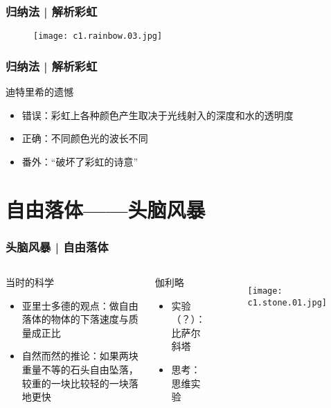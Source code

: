 \begin{frame}
  \frametitle{归纳法 | 解析彩虹}
  \begin{figure}
    \centering
    \texttt{[image: c1.rainbow.03.jpg]}
  \end{figure}
\end{frame}

\begin{frame}
  \frametitle{归纳法 | 解析彩虹}
  \begin{block}{迪特里希的遗憾}
    \begin{itemize}
      \item 错误：彩虹上各种颜色产生取决于光线射入的深度和水的透明度
      \item 正确：不同颜色光的波长不同
      \item 番外：“破坏了彩虹的诗意”
    \end{itemize}
  \end{block}
\end{frame}

\section{自由落体——头脑风暴}
\begin{frame}
  \frametitle{头脑风暴 | 自由落体}
  \begin{columns}
  \begin{block}{当时的科学}
    \begin{itemize}
      \item 亚里士多德的观点：做自由落体的物体的下落速度与质量成正比 
      \item 自然而然的推论：如果两块重量不等的石头自由坠落，较重的一块比较轻的一块落地更快
    \end{itemize}
  \end{block}
  \begin{block}{伽利略}
    \begin{itemize}
      \item 实验（？）：比萨尔斜塔
      \item 思考：思维实验
    \end{itemize}
  \end{block}
    \begin{figure}
      \centering
      \texttt{[image: c1.stone.01.jpg]}
    \end{figure}
  \end{columns}
\end{frame}

